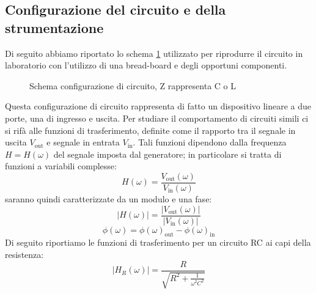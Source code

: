 \documentclass[letterpaper,12pt]{article}
\begin{document}
\subsection{Configurazione del circuito e della strumentazione}
Di seguito abbiamo riportato lo schema \ref{fig:config_circuito} utilizzato per riprodurre il circuito in laboratorio con l'utilizzo di una bread-board e degli opportuni componenti. 
\begin{figure}[h!]
    \centering
    \caption{Schema configurazione di circuito, Z rappresenta C o L }
    \label{fig:config_circuito}
\end{figure}
Questa configurazione di circuito rappresenta di fatto un dispositivo lineare a due porte, una di ingresso e uscita. Per studiare il comportamento di circuiti simili ci si rifà alle funzioni di trasferimento, definite come il rapporto tra il segnale in uscita $V_\text{out}$ e segnale in entrata $V_\text{in}$. 
Tali funzioni dipendono dalla frequenza $H = H(\omega)$ del segnale imposta dal generatore; in particolare si tratta di funzioni a variabili complesse: 
$$ H(\omega) = \frac{V_\text{out}(\omega)}{V_\text{in}(\omega)}$$ 
saranno quindi caratterizzate da un modulo e una fase: 
$$ |{H(\omega)| = \frac{|V_\text{out}(\omega)|}{|V_\text{in}(\omega)|}}$$
$$ \phi(\omega) = \phi(\omega)_\text{out} - \phi(\omega)_\text{in} $$
Di seguito riportiamo le funzioni di trasferimento per un circuito RC ai capi della resistenza:
\vspace{3pt}
\begin{equation}
\label{eq:Modulo RC (resistenza)}
    |H_R(\omega)| = \frac{R}{\sqrt{R^2 + \frac{1}{\omega^2C^2}}}
\end{equation}
\end{document}

